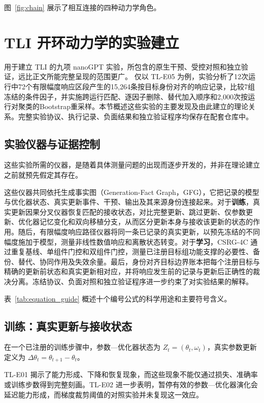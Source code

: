 图~\ref{fig:chain} 展示了相互连接的四种动力学角色。

\section{TLI 开环动力学的实验建立}

用于建立 TLI 的九项 nanoGPT 实验，所包含的原生干预、受控对照和独立验证，远比正文所能完整呈现的范围更广。 仅以 TL-E05 为例，实验分析了12次运行中72个有限幅度响应区段产生的15,264条按目标身份对齐的响应记录，比较7组冻结的条件因子，并实施跨运行匹配、逐因子删除、替代加入顺序和2,000次按运行对聚类的Bootstrap重采样。本节概述这些实验的主要发现及由此建立的理论关系。完整实验协议、执行记录、负面结果和独立验证程序均保存在配套仓库中。

\subsection{实验仪器与证据控制}

这些实验所需的仪器，是随着具体测量问题的出现而逐步开发的，并非在理论建立之前就预先假定其存在。

这些仪器共同依托生成事实图（Generation-Fact Graph，GFG），它把记录的模型与优化器状态、真实更新事件、干预、输出及其来源身份连接起来。对于\textbf{训练}，真实更新因果分叉仪器恢复匹配的接收状态，对比完整更新、跳过更新、仅参数更新、优化器记忆变化和双向移植分支，从而区分更新本身与接收该更新的状态的作用。随后，有限幅度响应路径仪器将同一条已记录的真实更新，以预先冻结的不同幅度施加于模型，测量非线性数值响应和离散状态转变。对于\textbf{学习}，CSRG-4C 通过重复基线、单组件门控和双组件门控，测量已注册目标组功能支撑的必要性、备份、替代、协同作用及失效余量。最后，身份对齐目标边界账本把每个注册目标与精确的更新前状态和真实更新相对应，并将响应发生前的记录与更新后正确性的裁决分离。冻结协议、负面对照和独立验证程序进一步约束了对实验结果的解释。


表~\ref{tab:equation_guide} 概述十个编号公式的科学用途和主要符号含义。

\subsection{训练：真实更新与接收状态}

在一个已注册的训练步骤中，参数—优化器状态为 $Z_t=(\theta_t,\omega_t)$，真实参数更新定义为 $\Delta\theta_t=\theta_{t+1}-\theta_t$。

TL-E01 揭示了能力形成、下降和恢复现象，而这些现象不能仅通过损失、准确率或训练步数得到完整刻画。TL-E02 进一步表明，暂停有效的参数—优化器演化会延迟能力形成，而梯度裁剪阈值的对照实验并未复现这一效应。


